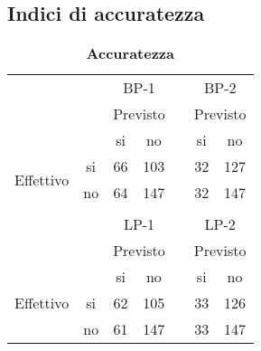 \documentclass[9pt,twocolumn,twoside]{osajnl}
\begin{document}
\subsection{Indici di accuratezza}
\label{matrici}


%
\begin{table}[htbp]
\centering
\begin{tabular}{cccclcc}
                           &                         & \multicolumn{2}{c}{BP-1}                           &                       & \multicolumn{2}{c}{BP-2}                           \\
                           &                         & \multicolumn{2}{c}{Previsto}                       &                       & \multicolumn{2}{c}{Previsto}                       \\
                           &                         & si                      & no                       &                       & si                      & no                       \\ \cline{3-4} \cline{6-7} 
\multirow{2}{*}{Effettivo} & \multicolumn{1}{c|}{si} & \multicolumn{1}{c|}{66} & \multicolumn{1}{c|}{103} & \multicolumn{1}{l|}{} & \multicolumn{1}{c|}{32} & \multicolumn{1}{c|}{127} \\ \cline{3-4} \cline{6-7} 
                           & \multicolumn{1}{c|}{no} & \multicolumn{1}{c|}{64} & \multicolumn{1}{c|}{147} & \multicolumn{1}{l|}{} & \multicolumn{1}{c|}{32} & \multicolumn{1}{c|}{147} \\ \cline{3-4} \cline{6-7} 
                           &                         &                         &                          &                       &                         &                          \\
                           &                         & \multicolumn{2}{c}{LP-1}                           &                       & \multicolumn{2}{c}{LP-2}                           \\
                           &                         & \multicolumn{2}{c}{Previsto}                       &                       & \multicolumn{2}{c}{Previsto}                       \\
                           &                         & si                      & no                       &                       & si                      & no                       \\ \cline{3-4} \cline{6-7} 
Effettivo                  & \multicolumn{1}{c|}{si} & \multicolumn{1}{c|}{62} & \multicolumn{1}{c|}{105} & \multicolumn{1}{l|}{} & \multicolumn{1}{c|}{33} & \multicolumn{1}{c|}{126} \\ \cline{3-4} \cline{6-7} 
                           & \multicolumn{1}{c|}{no} & \multicolumn{1}{c|}{61} & \multicolumn{1}{c|}{147} & \multicolumn{1}{l|}{} & \multicolumn{1}{c|}{33} & \multicolumn{1}{c|}{147} \\ \cline{3-4} \cline{6-7} 
\end{tabular}
\caption{\bf Accuratezza}
\label{tab:matrici}
\end{table}
%
\end{document}
